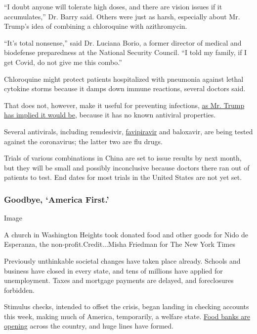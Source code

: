 ``I doubt anyone will tolerate high doses, and there are vision issues
if it accumulates,'' Dr. Barry said. Others were just as harsh,
especially about Mr. Trump's idea of combining a chloroquine with
azithromycin.

``It's total nonsense,'' said Dr. Luciana Borio, a former director of
medical and biodefense preparedness at the National Security Council.
``I told my family, if I get Covid, do not give me this combo.''

Chloroquine might protect patients hospitalized with pneumonia against
lethal cytokine storms because it damps down immune reactions, several
doctors said.

That does not, however, make it useful for preventing infections,
\href{http://transcripts.cnn.com/TRANSCRIPTS/2004/05/sitroom.02.html}{as
Mr. Trump has implied it would be}, because it has no known antiviral
properties.

Several antivirals, including remdesivir,
\href{https://www.scmp.com/tech/science-research/article/3051820/chinese-trials-gileads-antiviral-drug-treat-coronavirus-still}{favipiravir}
and baloxavir, are being tested against the coronavirus; the latter two
are flu drugs.

Trials of various combinations in China are set to issue results by next
month, but they will be small and possibly inconclusive because doctors
there ran out of patients to test. End dates for most trials in the
United States are not yet set.

\hypertarget{goodbye-america-first}{%
\subsubsection{Goodbye, `America First.'}\label{goodbye-america-first}}

Image

A church in Washington Heights took donated food and other goods for
Nido de Esperanza, the non-profit.Credit...Misha Friedman for The New
York Times

Previously unthinkable societal changes have taken place already.
Schools and business have closed in every state, and tens of millions
have applied for unemployment. Taxes and mortgage payments are delayed,
and foreclosures forbidden.

Stimulus checks, intended to offset the crisis, began landing in
checking accounts this week, making much of America, temporarily, a
welfare state.
\href{https://www.nytimes.com/2020/04/08/business/economy/coronavirus-food-banks.html}{Food
banks are opening} across the country, and huge lines have formed.

